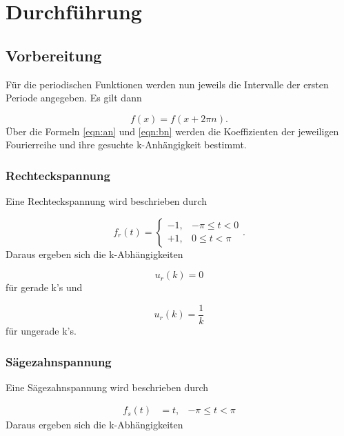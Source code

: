  \section{Durchführung}
\label{sec:Durchführung}

\subsection{Vorbereitung}
\label{sec:Vorbereitung}

Für die periodischen Funktionen werden nun jeweils die Intervalle der ersten
Periode angegeben. Es gilt dann

\begin{equation}
  f(x) = f(x+2\pi n).
\end{equation}
Über die Formeln \eqref{eqn:an} und \eqref{eqn:bn} werden
die Koeffizienten der jeweiligen Fourierreihe und ihre gesuchte
k-Anhängigkeit bestimmt.

\subsubsection{Rechteckspannung}

Eine Rechteckspannung wird beschrieben durch

\begin{equation}
  f_r(t) =
  \begin{cases}
    -1, & -\pi \leq t < 0 \\
    +1, & 0 \leq t < \pi
  \end{cases}.
\end{equation}
Daraus ergeben sich die k-Abhängigkeiten

\begin{equation}
  u_r(k) = 0
\end{equation}
für gerade k's und

\begin{equation}
  u_r(k) = \frac{1}{k}
\end{equation}
für ungerade k's.

\subsubsection{Sägezahnspannung}

Eine Sägezahnspannung wird beschrieben durch

\begin{align}
  f_s(t) & = t, & -\pi \leq t < \pi
\end{align}
Daraus ergeben sich die k-Abhängigkeiten


